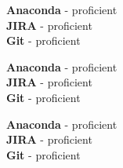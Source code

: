 \documentclass[9pt]{developercv} %
\begin{document}
\begin{minipage}[t]{0.3\textwidth}
	\vspace{-\baselineskip} %
	\textbf{Anaconda} - proficient\\
	\textbf{JIRA} - proficient\\
	\textbf{Git} - proficient\\
\end{minipage}
\begin{minipage}[t]{0.3\textwidth}
	\vspace{-\baselineskip} %
	\textbf{Anaconda} - proficient\\
	\textbf{JIRA} - proficient\\
	\textbf{Git} - proficient\\
\end{minipage}
\begin{minipage}[t]{0.3\textwidth}
	\vspace{-\baselineskip} %
	\textbf{Anaconda} - proficient\\
	\textbf{JIRA} - proficient\\
	\textbf{Git} - proficient\\
\end{minipage}
\end{document}
